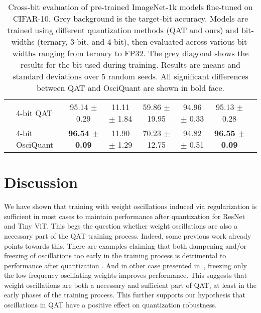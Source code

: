 \begin{table*}[t]
\begin{tabular}{llcccccc}
 \cmidrule(lr){2-7}
 & 4-bit QAT & 95.14 $\pm$ 0.29 & 11.11 $\pm$ 1.84 & 59.86 $\pm$ 19.95 & \cellcolor{gray!25}94.96 $\pm$ 0.33 & 95.13 $\pm$ 0.28 \\
 & 4-bit OsciQuant & {\bf 96.54 $\pm$ 0.09} & 11.90 $\pm$ 1.29 & {70.23 $\pm$ 12.75} & \cellcolor{gray!25}94.82 $\pm$ 0.51 & {\bf 96.55 $\pm$ 0.09} \\
\bottomrule
\end{tabular}
\caption{Cross-bit evaluation of pre-trained ImageNet-1k models fine-tuned on CIFAR-10. Grey background is the target-bit accuracy. Models are trained using different quantization methods (QAT and ours) and bit-widths (ternary, 3-bit, and 4-bit), then evaluated across various bit-widths ranging from ternary to FP32. The grey diagonal shows the results for the bit used during training. Results are means and standard deviations over 5 random seeds. All significant differences between QAT and OsciQuant are shown in bold face.}
\label{tab:robustness_results2}
\end{table*}


\section{Discussion}\label{sec:discussion}


We have shown that training with weight oscillations induced via regularization is sufficient in most cases to maintain performance after quantization for ResNet and Tiny ViT. This begs the question whether weight oscillations are also a necessary part of the QAT training process. Indeed, some previous work already points towards this. There are examples claiming that both dampening and/or freezing of oscillations too early in the training process is detrimental to performance after quantization \cite{nagel2022overcoming, ImprovingLowBit}. And in other case presented in~\citet{vitoscillations}, freezing only the low frequency oscillating weights improves performance.
This suggests that weight oscillations are both a necessary and sufficient part of QAT, at least in the early phases of the training process. This further supports our hypothesis that oscillations in QAT have a positive effect on quantization robustness.

